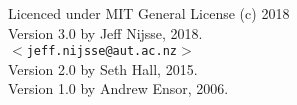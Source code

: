 \documentclass[a4paper]{book}
\begin{document}
 Licenced under MIT General License (c) 2018 \\     
 
 Version 3.0 by Jeff Nijsse, 2018.\\
 $<$\texttt{jeff.nijsse@aut.ac.nz}$>$\\
 Version 2.0 by Seth Hall, 2015.\\
 Version 1.0 by Andrew Ensor, 2006.
 
 
    \tableofcontents

  \mainmatter
%    
%    
%    
%    
%    

  \appendix
%    
\end{document}
